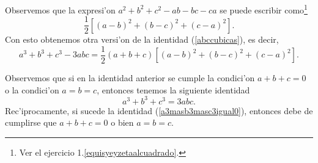 \vei

\noindent Observemos que la expresi'on $a^2+b^2+c^2-ab-bc-ca$ se puede 
escribir como\footnote{Ver el ejercicio 1.\ref{equisyeyzetaalcuadrado}.} 
\begin{equation*}
      \frac{1}{2} \left [ (a-b)^2+(b-c)^2 +(c-a)^2\right ].
\label{factorizaciondeacubica}
\end{equation*}      
Con esto obtenemos otra versi'on de la identidad (\ref{abccubicas}), es decir,
\begin{equation}
a^3+b^3+c^3-3abc=\frac{1}{2}(a+b+c)\left [ (a-b)^2+(b-c)^2 +(c-a)^2\right ].
\label{a3masb3masc3matrices}	     
\end{equation}

\vei

\noindent Observemos que si en la identidad anterior se cumple la condici'on 
$a+b+c=0$ o  la condici'on $a=b=c$, entonces tenemos  la siguiente identidad
\begin{equation}
a^3+b^3+c^3=3abc.
\label{a3masb3masc3igual0}
\end{equation}
Rec'iprocamente, si sucede la identidad (\ref{a3masb3masc3igual0}), entonces 
debe de cumplirse que $a+b+c=0$ o bien $a=b=c$.

\ve
\ve




